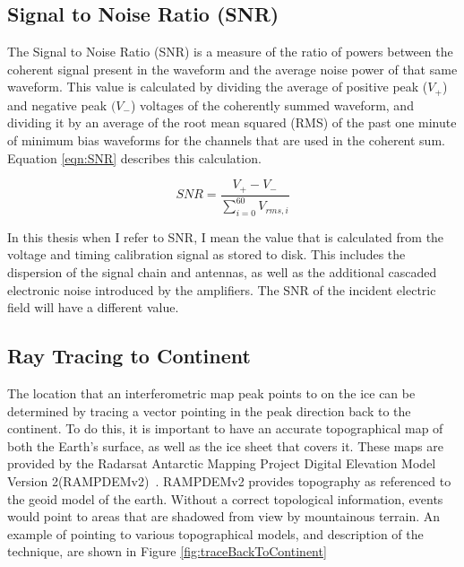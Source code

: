 		
	\subsection{Signal to Noise Ratio (SNR)}
		The Signal to Noise Ratio (SNR) is a measure of the ratio of powers between the coherent signal present in the waveform  and the average noise power of that same waveform.  This value is calculated by dividing the average of positive peak ($V_+$) and negative peak $(V_-$) voltages of the coherently summed waveform, and dividing it by an average of the root mean squared (RMS) of the  past one minute of minimum bias waveforms for the channels that are used in the coherent sum.  Equation \ref{eqn:SNR} describes this calculation.
		
	\begin{equation}
	SNR = \frac{V_{+}-V_{-}}{\sum^{60}_{i=0} V_{rms,i}}
	\label{eqn:SNR}
	\end{equation}
	
	In this thesis when I refer to SNR, I mean the value that is calculated from the voltage and timing calibration signal as stored to disk.  This includes the dispersion of the signal chain and antennas, as well as the additional cascaded electronic noise introduced by the amplifiers.  The SNR of the incident electric field will have a different value.
	
	
	\subsection{Ray Tracing to Continent}
		 The location that an interferometric map peak points to on the ice can be determined by tracing a vector pointing in the peak direction back to the continent.  To do this, it is important to have an accurate topographical map of both the Earth's surface, as well as the ice sheet that covers it.  These maps are provided by the Radarsat Antarctic Mapping Project Digital Elevation Model Version 2(RAMPDEMv2)~\cite{RAMPDEM}.  RAMPDEMv2 provides topography as referenced to the geoid model of the earth.  Without a correct topological information, events would point to areas that are shadowed from view by mountainous terrain.  An example of pointing to various topographical models, and description of the technique, are shown in Figure \ref{fig:traceBackToContinent}
		 
